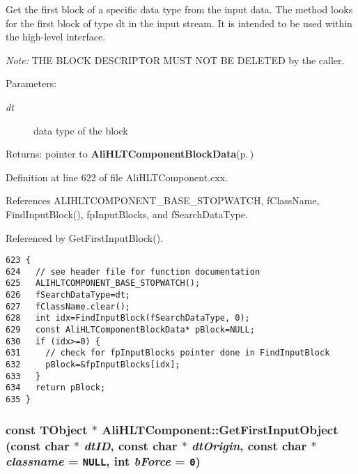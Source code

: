 Get the first block of a specific data type from the input data. The method looks for the first block of type dt in the input stream. It is intended to be used within the high-level interface.\par
 {\em Note:\/} THE BLOCK DESCRIPTOR MUST NOT BE DELETED by the caller. \begin{Desc}
\item[Parameters:]
\begin{description}
\item[{\em dt}]data type of the block \end{description}
\end{Desc}
\begin{Desc}
\item[Returns:]pointer to {\bf Ali\-HLTComponent\-Block\-Data}{\rm (p.\,\pageref{structAliHLTComponentBlockData})} \end{Desc}


Definition at line 622 of file Ali\-HLTComponent.cxx.

References ALIHLTCOMPONENT\_\-BASE\_\-STOPWATCH, f\-Class\-Name, Find\-Input\-Block(), fp\-Input\-Blocks, and f\-Search\-Data\-Type.

Referenced by Get\-First\-Input\-Block().

\footnotesize\begin{verbatim}623 {
624   // see header file for function documentation
625   ALIHLTCOMPONENT_BASE_STOPWATCH();
626   fSearchDataType=dt;
627   fClassName.clear();
628   int idx=FindInputBlock(fSearchDataType, 0);
629   const AliHLTComponentBlockData* pBlock=NULL;
630   if (idx>=0) {
631     // check for fpInputBlocks pointer done in FindInputBlock
632     pBlock=&fpInputBlocks[idx];
633   }
634   return pBlock;
635 }
\end{verbatim}\normalsize 


\subsubsection{\setlength{\rightskip}{0pt plus 5cm}const TObject $\ast$ Ali\-HLTComponent::Get\-First\-Input\-Object (const char $\ast$ {\em dt\-ID}, const char $\ast$ {\em dt\-Origin}, const char $\ast$ {\em classname} = {\tt NULL}, int {\em b\-Force} = {\tt 0})\hspace{0.3cm}{\tt  [protected]}}\label{classAliHLTComponent_b14}


